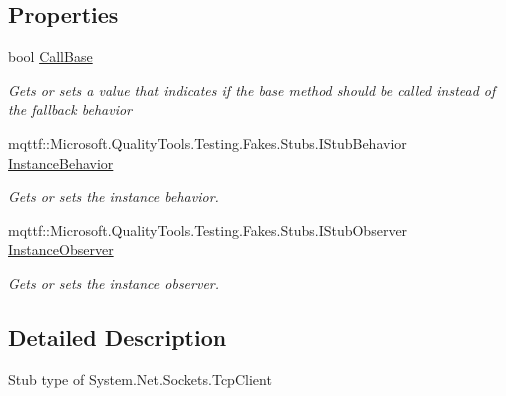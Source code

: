 \subsection*{Properties}
\begin{DoxyCompactItemize}
\item 
bool \hyperlink{class_system_1_1_net_1_1_sockets_1_1_fakes_1_1_stub_tcp_client_ad0bd61f1c79ff14fe6e9683ab0fb75fb}{Call\-Base}
\begin{DoxyCompactList}\small\item\em Gets or sets a value that indicates if the base method should be called instead of the fallback behavior\end{DoxyCompactList}\item 
mqttf\-::\-Microsoft.\-Quality\-Tools.\-Testing.\-Fakes.\-Stubs.\-I\-Stub\-Behavior \hyperlink{class_system_1_1_net_1_1_sockets_1_1_fakes_1_1_stub_tcp_client_a2e4798202c57593f8211d8d68981b7fd}{Instance\-Behavior}
\begin{DoxyCompactList}\small\item\em Gets or sets the instance behavior.\end{DoxyCompactList}\item 
mqttf\-::\-Microsoft.\-Quality\-Tools.\-Testing.\-Fakes.\-Stubs.\-I\-Stub\-Observer \hyperlink{class_system_1_1_net_1_1_sockets_1_1_fakes_1_1_stub_tcp_client_a28657d4a256845c0035316393c2e84c1}{Instance\-Observer}
\begin{DoxyCompactList}\small\item\em Gets or sets the instance observer.\end{DoxyCompactList}\end{DoxyCompactItemize}


\subsection{Detailed Description}
Stub type of System.\-Net.\-Sockets.\-Tcp\-Client



